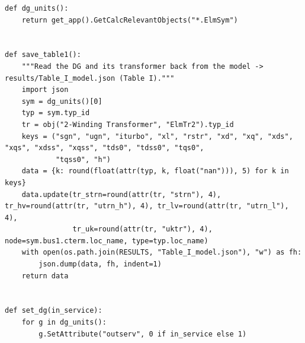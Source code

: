 \documentclass[12pt,a4paper]{article}
\begin{document}
\begin{lstlisting}
def dg_units():
    return get_app().GetCalcRelevantObjects("*.ElmSym")


def save_table1():
    """Read the DG and its transformer back from the model -> results/Table_I_model.json (Table I)."""
    import json
    sym = dg_units()[0]
    typ = sym.typ_id
    tr = obj("2-Winding Transformer", "ElmTr2").typ_id
    keys = ("sgn", "ugn", "iturbo", "xl", "rstr", "xd", "xq", "xds", "xqs", "xdss", "xqss", "tds0", "tdss0", "tqs0",
            "tqss0", "h")
    data = {k: round(float(attr(typ, k, float("nan"))), 5) for k in keys}
    data.update(tr_strn=round(attr(tr, "strn"), 4), tr_hv=round(attr(tr, "utrn_h"), 4), tr_lv=round(attr(tr, "utrn_l"), 4),
                tr_uk=round(attr(tr, "uktr"), 4), node=sym.bus1.cterm.loc_name, type=typ.loc_name)
    with open(os.path.join(RESULTS, "Table_I_model.json"), "w") as fh:
        json.dump(data, fh, indent=1)
    return data


def set_dg(in_service):
    for g in dg_units():
        g.SetAttribute("outserv", 0 if in_service else 1)
\end{lstlisting}
\end{document}
